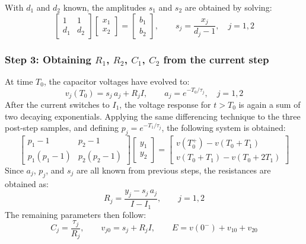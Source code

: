 With $d_1$ and $d_2$ known, the amplitudes $s_1$ and $s_2$ are obtained by solving:
\begin{equation}
    \begin{bmatrix} 
        1 & 1 \\ 
        d_1 & d_2 
    \end{bmatrix}
    \begin{bmatrix} 
        x_1 \\ 
        x_2 
    \end{bmatrix}
    =
    \begin{bmatrix} 
        b_1 \\ 
        b_2 
    \end{bmatrix},
    \qquad
    s_j = \frac{x_j}{d_j - 1}, \quad j = 1,2
    \label{eq:s_solve}
\end{equation}

\subsubsection{Step 3: Obtaining $R_1$, $R_2$, $C_1$, $C_2$ from the current step}

At time $T_0$, the capacitor voltages have evolved to:
\begin{equation}
    v_j(T_0) = s_j\, a_j + R_j I, \qquad a_j = e^{-T_0/\tau_j}, \quad j = 1,2
    \label{eq:cap_at_T0}
\end{equation}
After the current switches to $I_1$, the voltage response for $t > T_0$ is again a sum of two decaying exponentials. 
Applying the same differencing technique to the three post-step samples, and 
defining $p_j = e^{-T_1/\tau_j}$, the following system is obtained:
\begin{equation}
    \begin{bmatrix} 
        p_1-1 & p_2-1 \\ 
        p_1(p_1-1) & p_2(p_2-1) 
    \end{bmatrix}
    \begin{bmatrix} y_1 \\ 
        y_2 
    \end{bmatrix}
    =
    \begin{bmatrix} 
        v(T_0^+) - v(T_0+T_1) \\ 
        v(T_0+T_1) - v(T_0+2T_1) 
    \end{bmatrix}
    \label{eq:y_system}
\end{equation}
Since $a_j$, $p_j$, and $s_j$ are all known from previous steps, the resistances are obtained as:
\begin{equation}
    R_j = \frac{y_j - s_j\, a_j}{I - I_1}, \qquad j = 1,2
    \label{eq:Rj}
\end{equation}
The remaining parameters then follow:
\begin{equation}
    C_j = \frac{\tau_j}{R_j}, \qquad
    v_{j0} = s_j + R_j I, \qquad
    E = v(0^-) + v_{10} + v_{20}
    \label{eq:remaining}
\end{equation}

